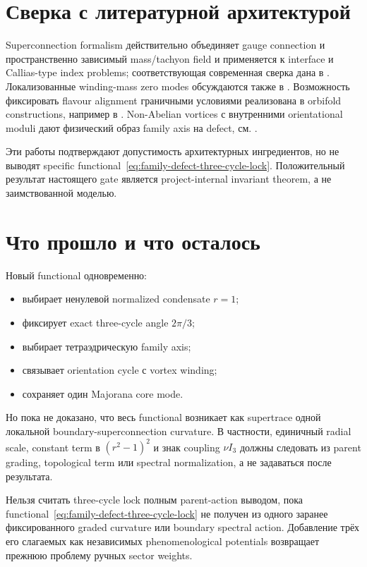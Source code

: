 \section{Сверка с литературной архитектурой}

Superconnection formalism действительно объединяет gauge connection и
пространственно зависимый mass/tachyon field и применяется к interface и
Callias-type index problems; соответствующая современная сверка дана в
. Локализованные winding-mass zero modes обсуждаются
также в . Возможность фиксировать flavour alignment
граничными условиями реализована в orbifold constructions, например в
. Non-Abelian vortices с внутренними orientational
moduli дают физический образ family axis на defect, см.
.

Эти работы подтверждают допустимость архитектурных ингредиентов, но не
выводят specific functional~\eqref{eq:family-defect-three-cycle-lock}.
Положительный результат настоящего gate является project-internal
invariant theorem, а не заимствованной моделью.

\section{Что прошло и что осталось}

Новый functional одновременно:
\begin{itemize}
 \item выбирает ненулевой normalized condensate \(r=1\);
 \item фиксирует exact three-cycle angle \(2\pi/3\);
 \item выбирает тетраэдрическую family axis;
 \item связывает orientation cycle с vortex winding;
 \item сохраняет один Majorana core mode.
\end{itemize}

Но пока не доказано, что весь functional возникает как supertrace одной
локальной boundary-superconnection curvature. В частности, единичный
radial scale, constant term в \((r^2-1)^2\) и знак coupling
\(\nu I_3\) должны следовать из parent grading, topological term или
spectral normalization, а не задаваться после результата.

\begin{nogocriterion}
Нельзя считать three-cycle lock полным parent-action выводом, пока
functional~\eqref{eq:family-defect-three-cycle-lock} не получен из одного
заранее фиксированного graded curvature или boundary spectral action.
Добавление трёх его слагаемых как независимых phenomenological potentials
возвращает прежнюю проблему ручных sector weights.
\end{nogocriterion}

